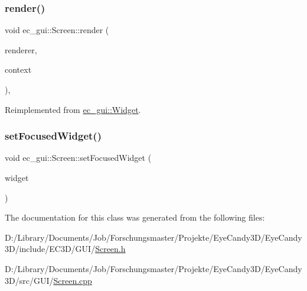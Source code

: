 \subsubsection{\texorpdfstring{render()}{render()}}
{\footnotesize\ttfamily void ec\+\_\+gui\+::\+Screen\+::render (\begin{DoxyParamCaption}\item[{\mbox{\hyperlink{classec__gui_1_1_gui_renderer}{Gui\+Renderer}} \&}]{renderer,  }\item[{\mbox{\hyperlink{classec__gui_1_1_gui_rendering_context}{Gui\+Rendering\+Context}} \&}]{context }\end{DoxyParamCaption})\hspace{0.3cm}{\ttfamily [override]}, {\ttfamily [virtual]}}



Reimplemented from \mbox{\hyperlink{classec__gui_1_1_widget_ade9b99741eb922b24f8328509483f129}{ec\+\_\+gui\+::\+Widget}}.

\mbox{\label{classec__gui_1_1_screen_a39b7f411e77c6db516e590605a0db872}} 
\subsubsection{\texorpdfstring{set\+Focused\+Widget()}{setFocusedWidget()}}
{\footnotesize\ttfamily void ec\+\_\+gui\+::\+Screen\+::set\+Focused\+Widget (\begin{DoxyParamCaption}\item[{\mbox{\hyperlink{classec__gui_1_1_widget}{Widget}} $\ast$}]{widget }\end{DoxyParamCaption})}



The documentation for this class was generated from the following files\+:\begin{DoxyCompactItemize}
\item 
D\+:/\+Library/\+Documents/\+Job/\+Forschungsmaster/\+Projekte/\+Eye\+Candy3\+D/\+Eye\+Candy3\+D/include/\+E\+C3\+D/\+G\+U\+I/\mbox{\hyperlink{_screen_8h}{Screen.\+h}}\item 
D\+:/\+Library/\+Documents/\+Job/\+Forschungsmaster/\+Projekte/\+Eye\+Candy3\+D/\+Eye\+Candy3\+D/src/\+G\+U\+I/\mbox{\hyperlink{_screen_8cpp}{Screen.\+cpp}}\end{DoxyCompactItemize}
